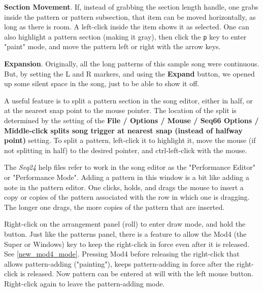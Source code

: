 \begin{enumber}
      \item \textbf{Section Movement}.
         If, instead of grabbing the section length handle, one grabs inside
         the pattern or pattern subsection, that item can be moved
         horizontally, as long as there is room.  A left-click
         inside the item shows it as selected.
         One can also highlight a pattern section (making it gray),
         then click the \texttt{p} key to enter "paint" mode, and move the
         pattern left or right with the arrow keys.
      \item \textbf{Expansion}.
         Originally, all the long patterns of this sample song were continuous.
         But, by setting the L and R markers, and using the \textbf{Expand}
         button, we opened up some silent space in the song, just to be able
         to show it off.
   \end{enumber}

   A useful feature is to split a pattern section in the
   song editor, either in half, or at the nearest snap point to the mouse
   pointer.
   The location of the split is determined by the
   setting of the \textbf{File / Options / Mouse / Seq66 Options /
   Middle-click splits song trigger at nearest snap (instead of halfway point)}
   setting.  To split a pattern, left-click it to highlight it, move
   the mouse (if not splitting in half) to the desired pointer, and
   ctrl-left-click with the mouse.

   The \textsl{Seq24} help files refer to work in the song editor as the
   "Performance Editor" or "Performance Mode".  Adding a pattern in this
   window is a bit like adding a note in the pattern editor.
   One clicks, holds, and drags the mouse to insert a copy or copies of the
   pattern associated with the row in which one is dragging.
   The longer one drags, the more copies of the pattern that are inserted.

	Right-click on the arrangement panel (roll) to enter
   draw mode, and hold the button.
   Just like the patterns panel, there is a feature to allow the Mod4 (the
   Super or Windows) key to keep the right-click in force even after it is
   released.  See \ref{new_mod4_mode}.  Pressing Mod4 before
   releasing the right-click that allows pattern-adding ("painting"), keeps
   pattern-adding in force after the right-click is released.  Now pattern
   can be entered at will with the left mouse button.  Right-click again to
   leave the pattern-adding mode.

